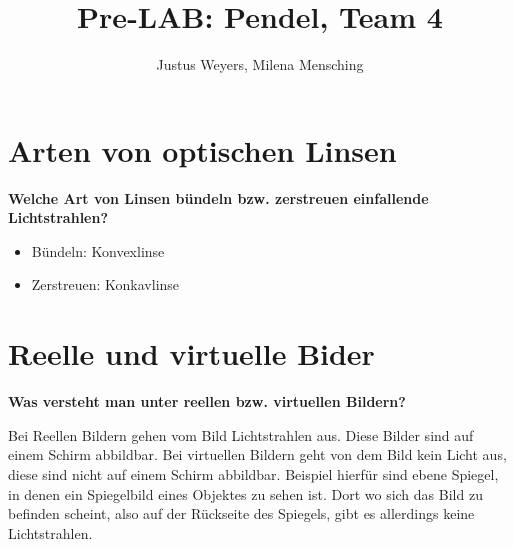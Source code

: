 \documentclass[a4paper, 12pt]{article}
\title{Pre-LAB: Pendel, Team 4}
\author{Justus Weyers, Milena Mensching}
\begin{document}
\maketitle

\section{Arten von optischen Linsen}
\textbf{Welche Art von Linsen bündeln bzw. zerstreuen einfallende Lichtstrahlen?}
\begin{itemize}
	\item Bündeln: Konvexlinse
	\item Zerstreuen: Konkavlinse
\end{itemize}

\section{Reelle und virtuelle Bider}
\textbf{Was versteht man unter reellen bzw. virtuellen Bildern?}

Bei Reellen Bildern gehen vom Bild Lichtstrahlen aus. 
Diese Bilder sind auf einem Schirm abbildbar. Bei virtuellen Bildern geht von dem Bild kein Licht aus, diese sind nicht auf einem Schirm abbildbar. 
Beispiel hierfür sind ebene Spiegel, in denen ein Spiegelbild eines Objektes zu sehen ist. 
Dort wo sich das Bild zu befinden scheint, also auf der Rückseite des Spiegels, gibt es allerdings keine Lichtstrahlen.
\vspace*{0.66cm}
\end{document}
